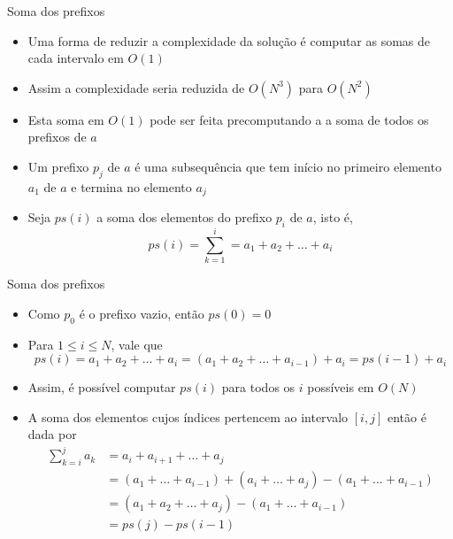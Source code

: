 \begin{frame}[fragile]{Soma dos prefixos}

    \begin{itemize}
        \item Uma forma de reduzir a complexidade da solução é computar as somas de cada
            intervalo em $O(1)$

        \item Assim a complexidade seria reduzida de $O(N^3)$ para $O(N^2)$

        \item Esta soma em $O(1)$ pode ser feita precomputando a a soma de todos os prefixos
            de $a$

        \item Um prefixo $p_j$ de $a$ é uma subsequência que tem início no primeiro elemento $a_1$
            de $a$ e termina no elemento $a_j$

        \item Seja $ps(i)$ a soma dos elementos do prefixo $p_i$ de $a$, isto é,
        \[
            ps(i) = \sum_{k = 1}^i = a_1 + a_2 + \ldots + a_i
        \]

    \end{itemize}

\end{frame}

\begin{frame}[fragile]{Soma dos prefixos}

    \begin{itemize}
        \item Como $p_0$ é o prefixo vazio, então $ps(0) = 0$

        \item Para $1\leq i\leq N$, vale que
        \[
            ps(i) = a_1 + a_2 + \ldots + a_i = (a_1 + a_2 + \ldots + a_{i - 1}) + a_i =
                ps(i - 1) + a_i
        \]

        \item Assim, é possível computar $ps(i)$ para todos os $i$ possíveis em $O(N)$

        \item A soma dos elementos cujos índices pertencem ao intervalo $[i, j]$ então é dada
            por
        \begin{align*}
            \sum_{k = i}^j a_k &= a_i + a_{i + 1} + \ldots + a_j \\
                &= (a_1 + \ldots + a_{i - 1}) + (a_i + \ldots + a_j) - (a_1 + \ldots + a_{i - 1}) \\
                &= (a_1 + a_2 + \ldots + a_j) - (a_1 + \ldots + a_{i - 1}) \\
                &= ps(j) - ps(i - 1)
        \end{align*}

    \end{itemize}

\end{frame}


